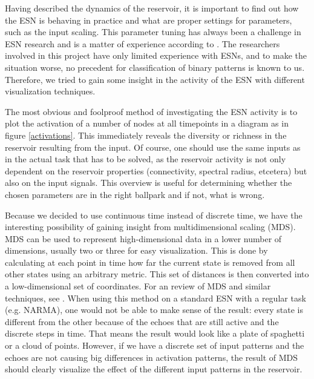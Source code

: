 \documentclass[10pt,a4paper]{report}
\begin{document}
Having described the dynamics of the reservoir, it is important to find out how the ESN is behaving in practice and what are proper settings for parameters, such as the input scaling. This parameter tuning has always been a challenge in ESN research and is a matter of experience according to \citet{Jaeger2001}. The researchers involved in this project have only limited experience with ESNs, and to make the situation worse, no precedent for classification of binary patterns is known to us. Therefore, we tried to gain some insight in the activity of the ESN with different visualization techniques.

The most obvious and foolproof method of investigating the ESN activity is to plot the activation of a number of nodes at all timepoints in a diagram as in figure \ref{activations}. This immediately reveals the diversity or richness in the reservoir resulting from the input. Of course, one should use the same inputs as in the actual task that has to be solved, as the reservoir activity is not only dependent on the reservoir properties (connectivity, spectral radius, etcetera) but also on the input signals. This overview is useful for determining whether the chosen parameters are in the right ballpark and if not, what is wrong.

Because we decided to use continuous time instead of discrete time, we have the interesting possibility of gaining insight from multidimensional scaling (MDS). MDS can be used to represent high-dimensional data in a lower number of dimensions, usually two or three for easy visualization. This is done by calculating at each point in time how far the current state is removed from all other states using an arbitrary metric. This set of distances is then converted into a low-dimensional set of coordinates. For an review of MDS and similar techniques, see \citet{Borg2005}. When using this method on a standard ESN with a regular task (e.g. NARMA), one would not be able to make sense of the result: every state is different from the other because of the echoes that are still active and the discrete steps in time. That means the result would look like a plate of spaghetti or a cloud of points. However, if we have a discrete set of input patterns and the echoes are not causing big differences in activation patterns, the result of MDS should clearly visualize the effect of the different input patterns in the reservoir. 
\end{document}
